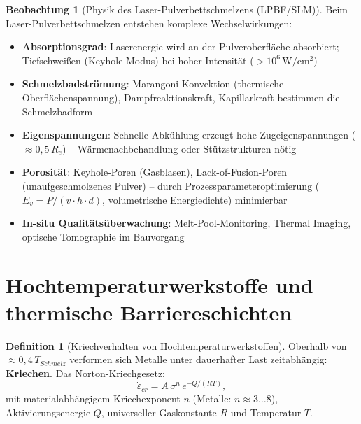 ﻿\documentclass[a4paper,12pt]{report}
\theoremstyle{definition}
\newtheorem{definition}{Definition}
\newtheorem{beobachtung}{Beobachtung}
\begin{document}
\begin{beobachtung}[Physik des Laser-Pulverbettschmelzens (LPBF/SLM)]
Beim Laser-Pulverbettschmelzen entstehen komplexe Wechselwirkungen:
\begin{itemize}
    \item[-] \textbf{Absorptionsgrad}: Laserenergie wird an der Pulveroberfläche
          absorbiert; Tiefschweißen (Keyhole-Modus) bei hoher Intensität ($> 10^6\,\mathrm{W/cm^2}$)
    \item[-] \textbf{Schmelzbadströmung}: Marangoni-Konvektion (thermische Oberflächenspannung),
          Dampfreaktionskraft, Kapillarkraft bestimmen die Schmelzbadform
    \item[-] \textbf{Eigenspannungen}: Schnelle Abkühlung erzeugt hohe Zugeigenspannungen
          ($\approx 0{,}5\,R_e$) -- Wärmenachbehandlung oder Stützstrukturen nötig
    \item[-] \textbf{Porosität}: Keyhole-Poren (Gasblasen), Lack-of-Fusion-Poren
          (unaufgeschmolzenes Pulver) -- durch Prozessparameteroptimierung ($E_v = P/(v\cdot h\cdot d)$,
          volumetrische Energiedichte) minimierbar
    \item[-] \textbf{In-situ Qualitätsüberwachung}: Melt-Pool-Monitoring,
          Thermal Imaging, optische Tomographie im Bauvorgang
\end{itemize}
\end{beobachtung}

\section{Hochtemperaturwerkstoffe und thermische Barriereschichten}

\begin{definition}[Kriechverhalten von Hochtemperaturwerkstoffen]
Oberhalb von $\approx 0{,}4\,T_{Schmelz}$ verformen sich Metalle unter
dauerhafter Last zeitabhängig: \textbf{Kriechen}.
Das Norton-Kriechgesetz:
\[
  \dot{\varepsilon}_{cr} = A\,\sigma^n\,e^{-Q/(RT)},
\]
mit materialabhängigem Kriechexponent $n$ (Metalle: $n \approx 3\ldots8$),
Aktivierungsenergie $Q$, universeller Gaskonstante $R$ und Temperatur $T$.
\end{definition}
\end{document}
